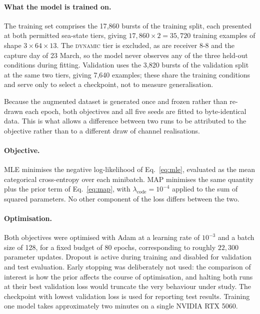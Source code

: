 \documentclass{article}
\begin{document}
\paragraph{What the model is trained on.}
The training set comprises the 17{,}860 bursts of the training split, each
presented at both permitted sea-state tiers, giving $17{,}860 \times 2 =
35{,}720$ training examples of shape $3 \times 64 \times 13$. The
\textsc{dynamic} tier is excluded, as are receiver 8-8 and the capture day of 23
March, so the model never observes any of the three held-out conditions during
fitting. Validation uses the 3{,}820 bursts of the validation split at the same
two tiers, giving 7{,}640 examples; these share the training conditions and serve
only to select a checkpoint, not to measure generalisation.

Because the augmented dataset is generated once and frozen rather than re-drawn
each epoch, both objectives and all five seeds are fitted to byte-identical data.
This is what allows a difference between two runs to be attributed to the
objective rather than to a different draw of channel realisations.

\paragraph{Objective.}
MLE minimises the negative log-likelihood of Eq.~\eqref{eq:mle}, evaluated as
the mean categorical cross-entropy over each minibatch. MAP minimises the same
quantity plus the prior term of Eq.~\eqref{eq:map}, with
$\lambda_{\text{code}} = 10^{-4}$ applied to the sum of squared parameters. No
other component of the loss differs between the two.

\paragraph{Optimisation.}
Both objectives were optimised with Adam at a learning rate of $10^{-3}$ and a
batch size of 128, for a fixed budget of 80 epochs, corresponding to roughly
$22{,}300$ parameter updates. Dropout is active during training and disabled for
validation and test evaluation. Early stopping was deliberately not used: the
comparison of interest is how the prior affects the course of optimisation, and
halting both runs at their best validation loss would truncate the very
behaviour under study. The checkpoint with lowest validation loss is used for
reporting test results. Training one model takes approximately two minutes on a
single NVIDIA RTX 5060.
\end{document}
